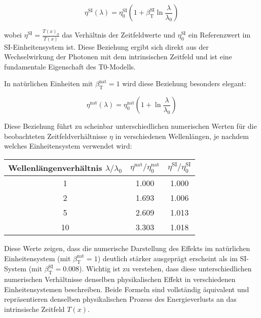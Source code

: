 \documentclass[12pt,a4paper]{article}
\newcommand{\Tfield}{T(x)}
\newcommand{\betaT}{\beta_{\text{T}}}
\begin{document}
\begin{equation}
	\eta^{\text{SI}}(\lambda) = \eta_0^{\text{SI}} \left(1 + \betaT^{\text{SI}} \ln \frac{\lambda}{\lambda_0}\right)
\end{equation}

wobei \(\eta^{\text{SI}} = \frac{\Tfield_0}{\Tfield}\) das Verhältnis der Zeitfeldwerte und \(\eta_0^{\text{SI}}\) ein Referenzwert im SI-Einheitensystem ist. Diese Beziehung ergibt sich direkt aus der Wechselwirkung der Photonen mit dem intrinsischen Zeitfeld und ist eine fundamentale Eigenschaft des T0-Modells.

In natürlichen Einheiten mit \(\betaT^{\text{nat}} = 1\) wird diese Beziehung besonders elegant:

\begin{equation}
	\eta^{\text{nat}}(\lambda) = \eta_0^{\text{nat}} \left(1 + \ln \frac{\lambda}{\lambda_0}\right)
\end{equation}

Diese Beziehung führt zu scheinbar unterschiedlichen numerischen Werten für die beobachteten Zeitfeldverhältnisse \(\eta\) in verschiedenen Wellenlängen, je nachdem welches Einheitensystem verwendet wird:

\begin{center}
	\begin{tabular}{|c|c|c|}
		\hline
		\textbf{Wellenlängenverhältnis $\lambda/\lambda_0$} & \textbf{$\eta^{\text{nat}}/\eta_0^{\text{nat}}$} & \textbf{$\eta^{\text{SI}}/\eta_0^{\text{SI}}$} \\
		\hline
		1 & 1.000 & 1.000 \\
		2 & 1.693 & 1.006 \\
		5 & 2.609 & 1.013 \\
		10 & 3.303 & 1.018 \\
		\hline
	\end{tabular}
\end{center}

Diese Werte zeigen, dass die numerische Darstellung des Effekts im natürlichen Einheitensystem (mit \(\betaT^{\text{nat}} = 1\)) deutlich stärker ausgeprägt erscheint als im SI-System (mit \(\betaT^{\text{SI}} = 0.008\)). Wichtig ist zu verstehen, dass diese unterschiedlichen numerischen Verhältnisse denselben physikalischen Effekt in verschiedenen Einheitensystemen beschreiben. Beide Formeln sind vollständig äquivalent und repräsentieren denselben physikalischen Prozess des Energieverlusts an das intrinsische Zeitfeld \(\Tfield\).
\end{document}
